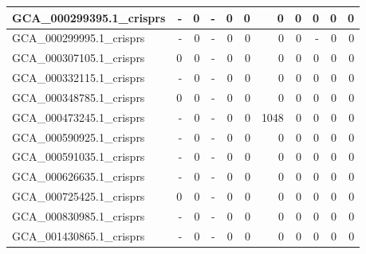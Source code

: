 \documentclass[12pt,a4paper]{article}
\begin{document}
\begin{table}[ht]
\begin{center}
\begin{tabular}{|l*{10}{|r}|}
GCA\_000299395.1\_crisprs & - & 0 & - & 0 & 0 & 0 & 0 & 0 & 0 & 0 \\ \hline
GCA\_000299995.1\_crisprs & - & 0 & - & 0 & 0 & 0 & 0 & - & 0 & 0 \\ \hline
GCA\_000307105.1\_crisprs & 0 & 0 & - & 0 & 0 & 0 & 0 & 0 & 0 & 0 \\ \hline
GCA\_000332115.1\_crisprs & - & 0 & - & 0 & 0 & 0 & 0 & 0 & 0 & 0 \\ \hline
GCA\_000348785.1\_crisprs & 0 & 0 & - & 0 & 0 & 0 & 0 & 0 & 0 & 0 \\ \hline
GCA\_000473245.1\_crisprs & - & 0 & - & 0 & 0 & 1048 & 0 & 0 & 0 & 0 \\ \hline
GCA\_000590925.1\_crisprs & - & 0 & - & 0 & 0 & 0 & 0 & 0 & 0 & 0 \\ \hline
GCA\_000591035.1\_crisprs & - & 0 & - & 0 & 0 & 0 & 0 & 0 & 0 & 0 \\ \hline
GCA\_000626635.1\_crisprs & - & 0 & - & 0 & 0 & 0 & 0 & 0 & 0 & 0 \\ \hline
GCA\_000725425.1\_crisprs & 0 & 0 & - & 0 & 0 & 0 & 0 & 0 & 0 & 0 \\ \hline
GCA\_000830985.1\_crisprs & - & 0 & - & 0 & 0 & 0 & 0 & 0 & 0 & 0 \\ \hline
GCA\_001430865.1\_crisprs & - & 0 & - & 0 & 0 & 0 & 0 & 0 & 0 & 0 \\ \hline
\end{tabular}
\end{center}
\end{table}
\end{document}
